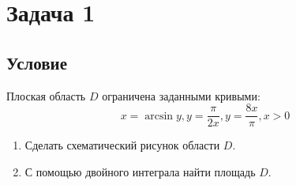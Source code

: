 \documentclass[12pt]{article}
\begin{document}
	\section*{Задача 1}	
	\subsection*{Условие}
	
	Плоская область $D$ ограничена заданными кривыми: $$x=\arcsin y, y=\frac{\pi}{2x}, y=\frac{8x}{\pi}, x > 0 $$
	
	\begin{enumerate}
		\item Сделать схематический рисунок области $D$.
		\item С помощью двойного интеграла найти площадь $D$.		
	\end{enumerate}
\end{document}
